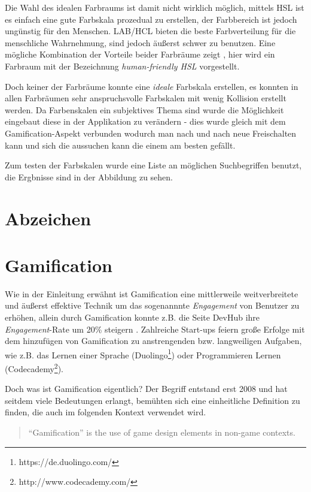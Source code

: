 \documentclass[12pt,twoside]{book}
\begin{document}
Die Wahl des idealen Farbraums ist damit nicht wirklich möglich, mittels HSL ist es einfach eine gute Farbskala prozedual zu erstellen, der Farbbereich ist jedoch ungünstig für den Menschen. LAB/HCL bieten die beste Farbverteilung für die menschliche Wahrnehmung, sind jedoch äußerst schwer zu benutzen. Eine mögliche Kombination der Vorteile beider Farbräume zeigt \citep{husl}, hier wird ein Farbraum mit der Bezeichnung \textit{human-friendly HSL} vorgestellt.

Doch keiner der Farbräume konnte eine \textit{ideale} Farbskala erstellen, es konnten in allen Farbräumen sehr anspruchsvolle Farbskalen mit wenig Kollision erstellt werden. Da Farbenskalen ein subjektives Thema sind wurde die Möglichkeit eingebaut diese in der Applikation zu verändern - dies wurde gleich mit dem Gamification-Aspekt verbunden wodurch man nach und nach neue Freischalten kann und sich die aussuchen kann die einem am besten gefällt.

Zum testen der Farbskalen wurde eine Liste an möglichen Suchbegriffen benutzt, die Ergbnisse sind in der Abbildung zu sehen.


\section{Abzeichen}

\section{Gamification}

Wie in der Einleitung erwähnt ist Gamification eine mittlerweile weitverbreitete und äußerst effektive Technik um das sogenannnte \textit{Engagement} von Benutzer zu erhöhen, allein durch Gamification konnte z.B. die Seite DevHub ihre \textit{Engagement}-Rate um 20\% steigern \citep{zichermann2011gamification}. Zahlreiche Start-ups feiern große Erfolge mit dem hinzufügen von Gamification zu anstrengenden bzw. langweiligen Aufgaben, wie z.B. das Lernen einer Sprache (Duolingo\footnote{https://de.duolingo.com/}) oder Programmieren Lernen (Codecademy\footnote{http://www.codecademy.com/}).

Doch was ist Gamification eigentlich? Der Begriff entstand erst 2008 und hat seitdem viele Bedeutungen erlangt, \citep{deterding2011game} bemühten sich eine einheitliche Definition zu finden, die auch im folgenden Kontext verwendet wird.

\begin{quote}
	``Gamification'' is the use of game design elements in non-game contexts.
\end{quote}
\end{document}
